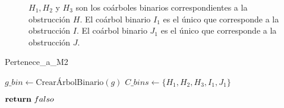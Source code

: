 \begin{figure}[ht!]
\begin{subfigure}{0.6\textwidth}
\end{subfigure}
\setlength{\abovecaptionskip}{5pt}
\caption{$H_1, H_2$ y $H_3$ son los coárboles binarios correspondientes a la obstrucción $H$. El coárbol binario $I_1$ es el único que corresponde a la obstrucción $I$. El coárbol binario $J_1$ es el único que corresponde a la obstrucción $J$.}\label{fig_obsts_bin}


\end{figure}


\begin{algorithm}[ht!]
\caption{Pertenece\_a\_M2}
\label{alg_decision}
\DontPrintSemicolon %

$g\_bin \gets \text{CrearÁrbolBinario}(g)$\;
$C\_bins \gets \{H_1, H_2, H_3, I_1, J_1\}$\;


$\Return\ falso$\;

\end{algorithm}


